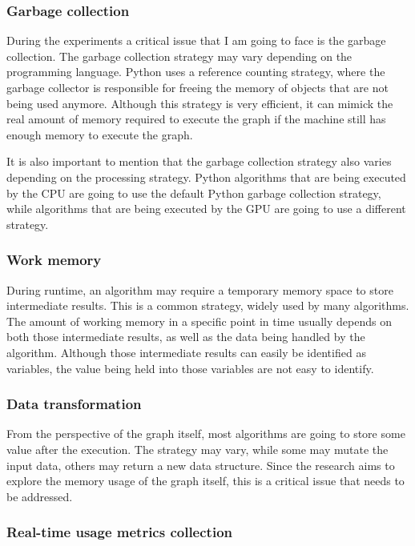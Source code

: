 \subsubsection{Garbage collection}

During the experiments a critical issue that I am going to face is the garbage collection.
The garbage collection strategy may vary depending on the programming language.
Python uses a reference counting strategy, where the garbage collector is responsible for freeing the memory of objects that are not being used anymore.
Although this strategy is very efficient, it can mimick the real amount of memory required to execute the graph if the machine still has enough memory to execute the graph.

It is also important to mention that the garbage collection strategy also varies depending on the processing strategy.
Python algorithms that are being executed by the CPU are going to use the default Python garbage collection strategy, while algorithms that are being executed by the GPU are going to use a different strategy.

\subsubsection{Work memory}

During runtime, an algorithm may require a temporary memory space to store intermediate results.
This is a common strategy, widely used by many algorithms.
The amount of working memory in a specific point in time usually depends on both those intermediate results, as well as the data being handled by the algorithm.
Although those intermediate results can easily be identified as variables, the value being held into those variables are not easy to identify.

\subsubsection{Data transformation}

From the perspective of the graph itself, most algorithms are going to store some value after the execution.
The strategy may vary, while some may mutate the input data, others may return a new data structure.
Since the research aims to explore the memory usage of the graph itself, this is a critical issue that needs to be addressed.

\subsubsection{Real-time usage metrics collection}

